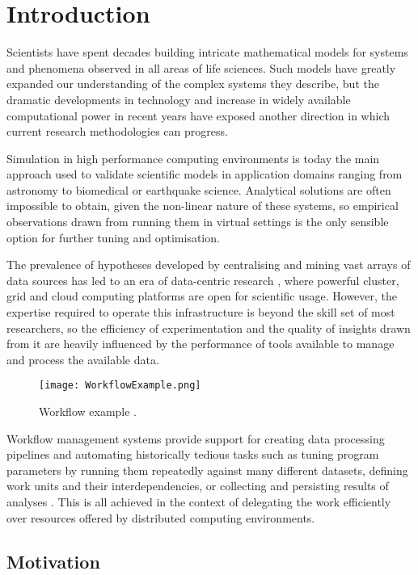 \chapter{Introduction}

Scientists have spent decades building intricate mathematical models for systems and phenomena observed in all areas of life sciences. Such models have greatly expanded our understanding of the complex systems they describe, but the dramatic developments in technology and increase in widely available computational power in recent years have exposed another direction in which current research methodologies can progress.

Simulation in high performance computing environments is today the main approach used to validate scientific models in application domains ranging from astronomy to biomedical or earthquake science. Analytical solutions are often impossible to obtain, given the non-linear nature of these systems, so empirical observations drawn from running them in virtual settings is the only sensible option for further tuning and optimisation.

The prevalence of hypotheses developed by centralising and mining vast arrays of data sources has led to an era of data-centric research \cite{Goble2009}, where powerful cluster, grid and cloud computing platforms are open for scientific usage. However, the expertise required to operate this infrastructure is beyond the skill set of most researchers, so the efficiency of experimentation and the quality of insights drawn from it are heavily influenced by the performance of tools available to manage and process the available data.

\begin{figure}[H]
	\centering
		\texttt{[image: WorkflowExample.png]}
	\caption{Workflow example \cite{Curcin2008}.}
	\label{WorkflowExample}
\end{figure}

Workflow management systems provide support for creating data processing pipelines and automating historically tedious tasks such as tuning program parameters by running them repeatedly against many different datasets, defining work units and their interdependencies, or collecting and persisting results of analyses \cite{Goble2009, Taylor2007}. This is all achieved in the context of delegating the work efficiently over resources offered by distributed computing environments.

\section{Motivation}

